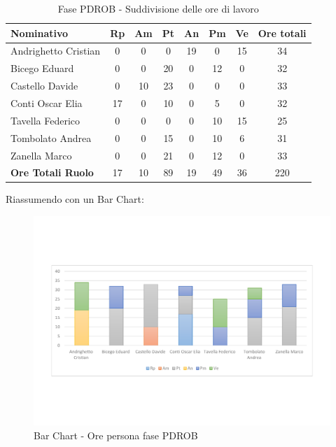 \documentclass[../PianoProgetto.tex]{subfiles}
\begin{document}
	\begin{table}[h]
	
		\begin{tabularx}{\textwidth}{l  * {6}{C}  c}
			\toprule
			\textbf{Nominativo} & \textbf{Rp} & \textbf{Am} & \textbf{Pt} 
						& \textbf{An} & \textbf{Pm} & \textbf{Ve} & \textbf{Ore totali} \\
			\midrule
			Andrighetto Cristian & 0 &	0 &	0 &	19 & 0 & 15 & 34 \\
			Bicego Eduard & 0 &	0 &	20 & 0 & 12 & 0 & 32 \\
			Castello Davide & 0 & 10 & 23 &	0 &	0 &	0 &	33 \\
			Conti Oscar Elia & 17 &	0 &	10 & 0 & 5 & 0 & 32 \\
			Tavella Federico &	0 &	0 &	0 &	0 &	10 & 15 & 25 \\
			Tombolato Andrea & 0 & 0 &	15 & 0 & 10 & 6 & 31 \\
			Zanella Marco & 0 & 0 &	21 & 0 & 12 & 0 & 33 \\
			\midrule			
			\textbf{Ore Totali Ruolo} & 17 & 10 & 89 & 19 & 49 &	36 & 220 \\
			\bottomrule
		\end{tabularx}
		\caption{Fase PDROB - Suddivisione delle ore di lavoro}
		\label{tab:fasePDROB_ore}
	\end{table}
\vfill
\newpage
\vfill	
	Riassumendo con un Bar Chart:	
	
	\begin{figure}[!h]
		\centering
		\includegraphics[width=\textwidth , trim=2cm 5cm 2cm 5cm]{grafici/PDROB/PDROB-ore-persona}
			\caption{Bar Chart - Ore persona fase PDROB}
		\label{fig:BarChart-fasePDROB_ore}
	\end{figure}
\vfill	
\end{document}
